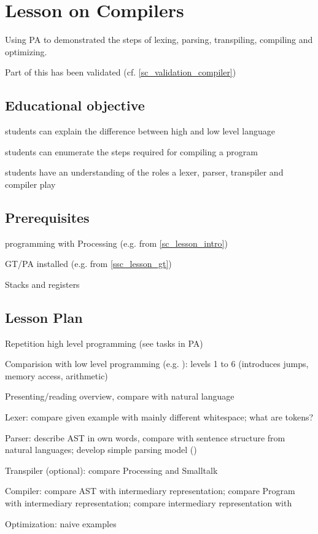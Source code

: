 \section{Lesson on Compilers} \label{sc_lesson_compiler}
Using PA to demonstrated the steps of lexing, parsing, transpiling, compiling and optimizing.

Part of this has been validated (cf. \ref{sc_validation_compiler})

\subsection{Educational objective}

\begin{todo}
\item students can explain the difference between high and low level language
\item students can enumerate the steps required for compiling a program
\item students have an understanding of the roles a lexer, parser, transpiler and compiler play
\end{todo}


\subsection{Prerequisites}

\begin{todo}
\item programming with Processing (e.g. from \ref{sc_lesson_intro})
\item GT/PA installed (e.g. from \ref{ssc_lesson_gt})
\item Stacks and registers
\end{todo}


\subsection{Lesson Plan}

\begin{todo}
\item Repetition high level programming (see tasks in PA)
\item Comparision with low level programming (e.g. \cite{Tom15}): levels 1 to 6 (introduces jumps, memory access, arithmetic)
\item Presenting/reading overview, compare with natural language
\item Lexer: compare given example with mainly different whitespace; what are tokens?
\item Parser: describe AST in own words, compare with sentence structure from natural languages; develop simple parsing model ()
\item Transpiler (optional): compare Processing and Smalltalk
\item Compiler: compare AST with intermediary representation; compare Program with intermediary representation; compare intermediary representation with \cite{Tom15}
\item Optimization: naive examples
\end{todo}


